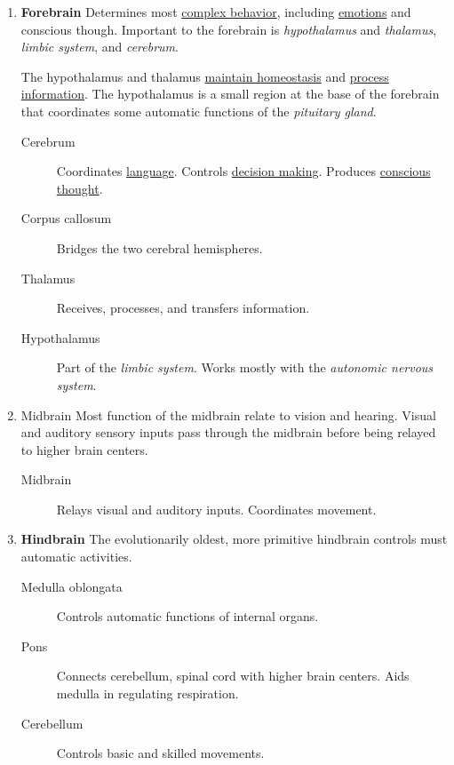 \documentclass[11pt]{article}
\begin{document}
\begin{enumerate}
\item \textbf{Forebrain}
\label{sec:org9995983}
Determines most \uline{complex behavior}, including \uline{emotions} and conscious though.
Important to the forebrain is \emph{hypothalamus} and \emph{thalamus}, \emph{limbic system}, and
\emph{cerebrum}.

The hypothalamus and thalamus \uline{maintain homeostasis} and \uline{process information}.
The hypothalamus is a small region at the base of the forebrain that
coordinates some automatic functions of the \emph{pituitary gland}.

\begin{description}
\item[{Cerebrum}] Coordinates \uline{language}. Controls \uline{decision making}. Produces
\uline{conscious thought}.
\item[{Corpus callosum}] Bridges the two cerebral hemispheres.
\item[{Thalamus}] Receives, processes, and transfers information.
\item[{Hypothalamus}] Part of the \emph{limbic system}. Works mostly with the
\emph{autonomic nervous system}.
\end{description}

\item Midbrain
\label{sec:org6afda63}
Most function of the midbrain relate to vision and hearing. Visual and
auditory sensory inputs pass through the midbrain before being relayed to
higher brain centers.

\begin{description}
\item[{Midbrain}] Relays visual and auditory inputs. Coordinates movement.
\end{description}

\item \textbf{Hindbrain}
\label{sec:orgdab2217}
The evolutionarily oldest, more primitive hindbrain controls must automatic
activities.

\begin{description}
\item[{Medulla oblongata}] Controls automatic functions of internal organs.
\item[{Pons}] Connects cerebellum, spinal cord with higher brain centers.
Aids medulla in regulating respiration.
\item[{Cerebellum}] Controls basic and skilled movements.
\end{description}
\end{enumerate}
\end{document}
